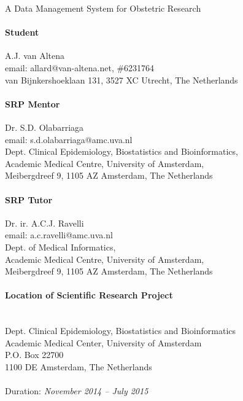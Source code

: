 \thispagestyle{empty}

\begin{center}
	{\huge{A Data Management System for Obstetric Research}}
\end{center}
\bigskip

\paragraph{Student}
A.J. van Altena\\
email: allard@van-altena.net, \#6231764\\
van Bijnkershoeklaan 131, 3527 XC Utrecht, The Netherlands

\paragraph{SRP Mentor}
Dr. S.D. Olabarriaga\\
email: s.d.olabarriaga@amc.uva.nl\\
Dept. Clinical Epidemiology, Biostatistics and Bioinformatics,\\
Academic Medical Centre, University of Amsterdam,\\
Meibergdreef 9, 1105 AZ  Amsterdam, The Netherlands

\paragraph{SRP Tutor}
Dr. ir. A.C.J. Ravelli\\
email: a.c.ravelli@amc.uva.nl\\
Dept. of Medical Informatics,\\
Academic Medical Centre, University of Amsterdam,\\
Meibergdreef 9, 1105 AZ  Amsterdam, The Netherlands

\paragraph{Location of Scientific Research Project}\mbox{}\\
Dept. Clinical Epidemiology, Biostatistics and Bioinformatics \\
Academic Medical Center, University of Amsterdam \\
P.O. Box 22700 \\
1100 DE Amsterdam, The Netherlands\\
\mbox{}\\
Duration: \textit{November 2014 -- July 2015}

\clearpage
